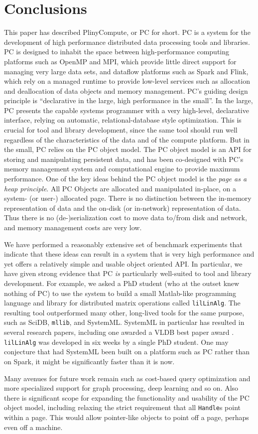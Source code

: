 
\section{Conclusions}
\label{sec:conc}
This paper has described PlinyCompute, or PC for short.  PC is a system for the development of high performance
distributed data processing tools and libraries.  PC is designed to inhabit the space between
high-performance computing platforms such as OpenMP and MPI, which provide little direct support
for managing very large data sets, and dataflow platforms such as Spark and Flink, which rely on 
a managed runtime to provide low-level services such as allocation and deallocation of data objects and memory management.
PC's guiding design principle is ``declarative in the large,
high performance in the small''.
In the large, PC presents the capable systems programmer with a very high-level, declarative interface, relying on automatic,
relational-database style optimization.  This is crucial for tool and library development, since the same tool should run well
regardless of the characteristics of the data and of the compute platform.  But in the small, PC relies on the PC object model.
The PC object model is an
API for storing and manipulating persistent data, and has been co-designed with PC's memory management
system and computational engine to provide maximum performance.
One of the key ideas behind the PC object model is the \emph{page as a heap principle}. All PC
Objects are allocated and manipulated in-place, on a system- (or user-) allocated page. There is no distinction
between the in-memory representation of data and the on-disk (or in-network) representation of data.
Thus there is no (de-)serialization cost to move data to/from disk and network, and memory management
costs are very low.

We have performed a reasonably extensive set of benchmark experiments that indicate that these ideas can result in 
a system that is very high performance and yet offers a relatively simple and usable object oriented API.  In particular, 
we have given strong evidence that PC \emph{is} particularly well-suited to tool and library development. 
For example, we asked a PhD
student (who at the outset knew nothing of PC) to use the system to build a small Matlab-like programming
language and library for distributed matrix operations called
\texttt{lilLinAlg}.  The resulting tool outperformed many other, long-lived tools
for the same purpose, such as SciDB, \texttt{mllib}, and SystemML.  SystemML in particular has resulted 
in several research papers,
including one awarded a VLDB best paper award \cite{boehm2016systemml}.
\texttt{lilLinAlg} was developed in six weeks by a single PhD student.
One may conjecture that had SystemML been built on a platform such as PC rather than on Spark, it might be significantly
faster than it is now.

Many avenues for future work remain such as cost-based query
optimization and more specialized support for graph processing, deep
learning and so on. Also there is significant scope for expanding the functionality and
usability of the PC object model, including relaxing the strict requirement that all \texttt{Handle}s point within a page.  This
would allow pointer-like objects to point off a page, perhaps even off a machine.  
